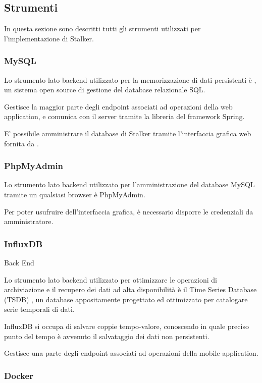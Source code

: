 \documentclass[../../../manuale-manutentore.tex]{subfiles}
\begin{document}
\subsection{Strumenti}%
\label{sub:strumenti}
In questa sezione sono descritti tutti gli strumenti utilizzati per l'implementazione di Stalker.

\subsubsection{MySQL}%
\label{subs:mysql}
Lo strumento lato backend utilizzato per la memorizzazione di dati persistenti è , un sistema open source di gestione del database relazionale SQL\@.

Gestisce la maggior parte degli endpoint associati ad operazioni della web application, e comunica con il server tramite la libreria  del framework Spring.

E' possibile amministrare il database di Stalker tramite l'interfaccia grafica web fornita da .

\subsubsection{PhpMyAdmin}%
\label{subs:phpmyadmin}

Lo strumento lato backend utilizzato per l'amministrazione del database MySQL tramite un qualsiasi browser è PhpMyAdmin.

Per poter usufruire dell'interfaccia grafica, è necessario disporre le credenziali da amministratore.

\subsubsection{InfluxDB}%
\label{subs:influxdb}
Back End

Lo strumento lato backend utilizzato per ottimizzare le operazioni di archiviazione e il recupero dei dati ad alta disponibilità è il Time Series Database (TSDB) , un database appositamente progettato ed ottimizzato per catalogare serie temporali di dati.

InfluxDB si occupa di salvare coppie tempo-valore, conoscendo in quale preciso punto del tempo è avvenuto il salvataggio dei dati non persistenti.

Gestisce una parte degli endpoint associati ad operazioni della mobile application.

\subsubsection{Docker}%
\label{subs:docker}
\end{document}

